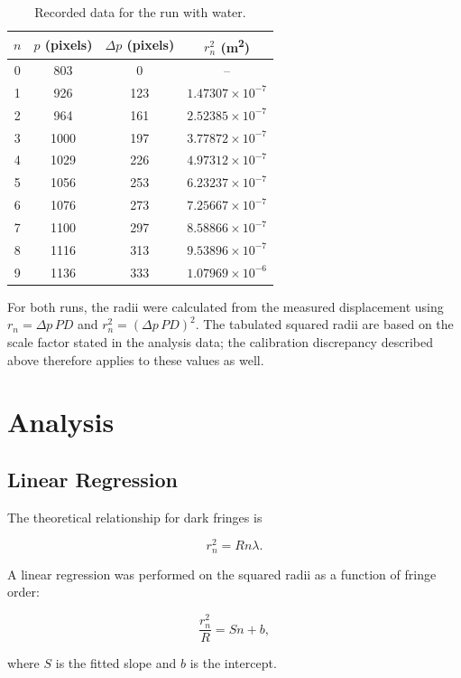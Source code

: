 \documentclass[12pt,a4paper]{article}
\begin{document}
\begin{table}[H]
\centering
\caption{Recorded data for the run with water.}
\label{tab:water}
\small
\begin{tabular}{cccc}
\toprule
$n$ & $p$ (pixels) & $\Delta p$ (pixels) & $r_n^2$ (\si{m^2})\\
\midrule
0 & 803 & 0 & -- \\
1 & 926 & 123 & $1.47307\times10^{-7}$ \\
2 & 964 & 161 & $2.52385\times10^{-7}$ \\
3 & 1000 & 197 & $3.77872\times10^{-7}$ \\
4 & 1029 & 226 & $4.97312\times10^{-7}$ \\
5 & 1056 & 253 & $6.23237\times10^{-7}$ \\
6 & 1076 & 273 & $7.25667\times10^{-7}$ \\
7 & 1100 & 297 & $8.58866\times10^{-7}$ \\
8 & 1116 & 313 & $9.53896\times10^{-7}$ \\
9 & 1136 & 333 & $1.07969\times10^{-6}$ \\
\bottomrule
\end{tabular}
\end{table}

For both runs, the radii were calculated from the measured displacement using $r_n=\Delta p\,PD$ and $r_n^2=(\Delta p\,PD)^2$. The tabulated squared radii are based on the scale factor stated in the analysis data; the calibration discrepancy described above therefore applies to these values as well.

\newpage

\section{Analysis}

\subsection{Linear Regression}

The theoretical relationship for dark
fringes is

\[
r_n^2=Rn\lambda.
\]

A linear regression was performed on
the squared radii as a function of
fringe order:

\[
\frac{r_n^2}{R}=Sn+b,
\]

where $S$ is the fitted slope and $b$
is the intercept.
\end{document}
